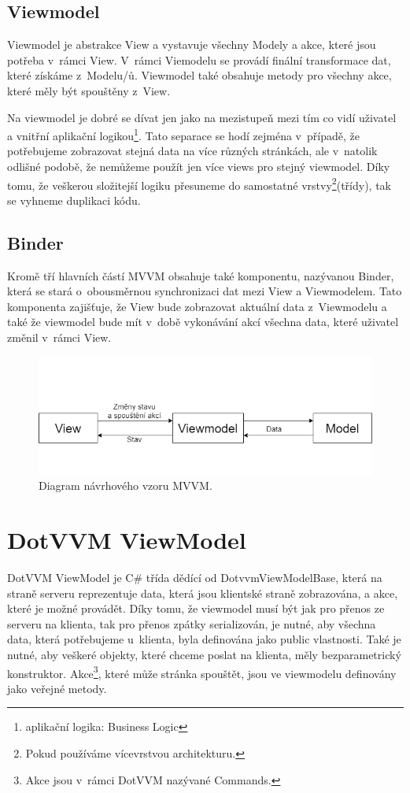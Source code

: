 \subsection*{Viewmodel}
Viewmodel je abstrakce View a vystavuje všechny Modely a akce, které jsou potřeba v~rámci View. V~rámci Viemodelu se provádí finální transformace dat, které získáme z~Modelu/ů. Viewmodel také obsahuje metody pro všechny akce, které měly být spouštěny z~View.

Na viewmodel je dobré se dívat jen jako na mezistupeň mezi tím co vidí uživatel a vnitřní aplikační logikou\footnote{aplikační logika: Business Logic}. Tato separace se hodí zejména v~případě, že potřebujeme zobrazovat stejná data na více různých stránkách, ale v~natolik odlišné podobě, že nemůžeme použít jen více views pro stejný viewmodel. Díky tomu, že veškerou složitejší logiku přesuneme do samostatné vrstvy\footnote{Pokud používáme vícevrstvou architekturu.}(třídy), tak se vyhneme duplikaci kódu.
\subsection*{Binder}
Kromě tří hlavních částí MVVM obsahuje také komponentu, nazývanou Binder, která se stará o~obousměrnou synchronizaci dat mezi View a Viewmodelem. Tato komponenta zajišťuje, že View bude zobrazovat aktuální data z~Viewmodelu a také že viewmodel bude mít v~době vykonávání akcí všechna data, které uživatel změnil v~rámci View.
\begin{figure}[!h]
	\centering
	\includegraphics[width=1\textwidth]{obrazky-figures/MVVM.png}
	\caption{Diagram návrhového vzoru MVVM.}
	\label{MVVM DIAGRAM}
\end{figure}
\section{DotVVM ViewModel}

DotVVM ViewModel je C\# třída dědící od DotvvmViewModelBase, která na straně serveru reprezentuje data, která jsou klientské straně zobrazována, a akce, které je možné provádět.
Díky tomu, že viewmodel musí být jak pro přenos ze serveru na klienta, tak pro přenos zpátky serializován, je nutné, aby všechna data, která potřebujeme u~klienta, byla definována jako public vlastnosti. Také je nutné, aby veškeré objekty, které chceme poslat na klienta, měly bezparametrický konstruktor.
Akce\footnote{Akce jsou v~rámci DotVVM nazývané Commands.\cite{DotVVM-VM}}, které může stránka spouštět, jsou ve viewmodelu definovány jako veřejné metody.

